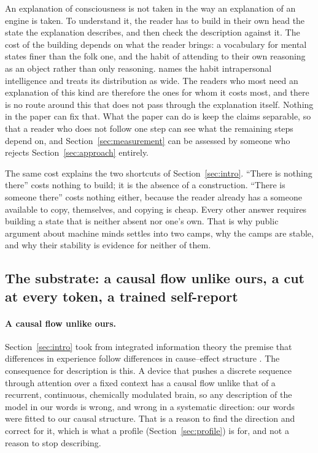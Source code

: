 An explanation of consciousness is not taken in the way an explanation of an engine is taken. To
understand it, the reader has to build in their own head the state the explanation describes, and then
check the description against it. The cost of the building depends on what the reader brings: a
vocabulary for mental states finer than the folk one, and the habit of attending to their own reasoning
as an object rather than only reasoning. \citet{gardner1983} names the habit intrapersonal
intelligence and treats its distribution as wide. The readers who most need an explanation of this kind
are therefore the ones for whom it costs most, and there is no route around this that does not pass
through the explanation itself. Nothing in the paper can fix that. What the paper can do is keep the
claims separable, so that a reader who does not follow one step can see what the remaining steps depend
on, and Section~\ref{sec:measurement} can be assessed by someone who rejects Section~\ref{sec:approach}
entirely.

The same cost explains the two shortcuts of Section~\ref{sec:intro}. ``There is nothing there'' costs
nothing to build; it is the absence of a construction. ``There is someone there'' costs nothing either,
because the reader already has a someone available to copy, themselves, and copying is cheap. Every
other answer requires building a state that is neither absent nor one's own. That is why public
argument about machine minds settles into two camps, why the camps are stable, and why their stability
is evidence for neither of them.

\subsection{The substrate: a causal flow unlike ours, a cut at every token, a trained self-report}
\label{sec:substrate}

\paragraph{A causal flow unlike ours.}
Section~\ref{sec:intro} took from integrated information theory the premise that differences in
experience follow differences in cause--effect structure \citep{tononi2015}. The consequence for
description is this. A device that pushes a discrete sequence through attention over a fixed context
has a causal flow unlike that of a recurrent, continuous, chemically modulated brain, so any description
of the model in our words is wrong, and wrong in a systematic direction: our words were fitted to our
causal structure. That is a reason to find the direction and correct for it, which is what a profile
(Section~\ref{sec:profile}) is for, and not a reason to stop describing.

